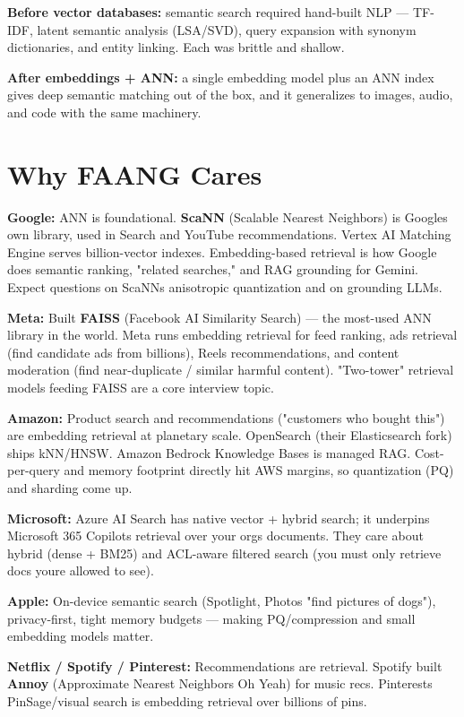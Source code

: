 \documentclass[11pt]{article}
\begin{document}
\textbf{Before vector databases:} semantic search required hand-built NLP --- TF-IDF, latent semantic analysis (LSA/SVD), query expansion with synonym dictionaries, and entity linking. Each was brittle and shallow.

\textbf{After embeddings + ANN:} a single embedding model plus an ANN index gives deep semantic matching out of the box, and it generalizes to images, audio, and code with the same machinery.

\section{Why FAANG Cares}\label{why-faang-cares}

\textbf{Google:} ANN is foundational. \textbf{ScaNN} (Scalable Nearest Neighbors) is Google\textquotesingle s own library, used in Search and YouTube recommendations. Vertex AI Matching Engine serves billion-vector indexes. Embedding-based retrieval is how Google does semantic ranking, "related searches," and RAG grounding for Gemini. Expect questions on ScaNN\textquotesingle s anisotropic quantization and on grounding LLMs.

\textbf{Meta:} Built \textbf{FAISS} (Facebook AI Similarity Search) --- the most-used ANN library in the world. Meta runs embedding retrieval for feed ranking, ads retrieval (find candidate ads from billions), Reels recommendations, and content moderation (find near-duplicate / similar harmful content). "Two-tower" retrieval models feeding FAISS are a core interview topic.

\textbf{Amazon:} Product search and recommendations ("customers who bought this") are embedding retrieval at planetary scale. OpenSearch (their Elasticsearch fork) ships kNN/HNSW. Amazon Bedrock Knowledge Bases is managed RAG. Cost-per-query and memory footprint directly hit AWS margins, so quantization (PQ) and sharding come up.

\textbf{Microsoft:} Azure AI Search has native vector + hybrid search; it underpins Microsoft 365 Copilot\textquotesingle s retrieval over your org\textquotesingle s documents. They care about hybrid (dense + BM25) and ACL-aware filtered search (you must only retrieve docs you\textquotesingle re allowed to see).

\textbf{Apple:} On-device semantic search (Spotlight, Photos "find pictures of dogs"), privacy-first, tight memory budgets --- making PQ/compression and small embedding models matter.

\textbf{Netflix / Spotify / Pinterest:} Recommendations are retrieval. Spotify built \textbf{Annoy} (Approximate Nearest Neighbors Oh Yeah) for music recs. Pinterest\textquotesingle s PinSage/visual search is embedding retrieval over billions of pins.
\end{document}
